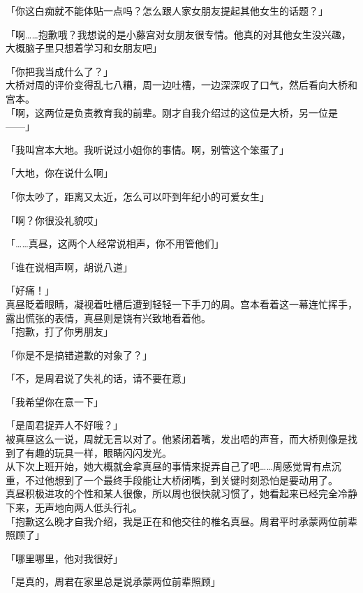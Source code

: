 「你这白痴就不能体贴一点吗？怎么跟人家女朋友提起其他女生的话题？」

「啊……抱歉哦？我想说的是小藤宫对女朋友很专情。他真的对其他女生没兴趣，大概脑子里只想着学习和女朋友吧」

「你把我当成什么了？」\\

大桥对周的评价变得乱七八糟，周一边吐槽，一边深深叹了口气，然后看向大桥和宫本。\\

「啊，这两位是负责教育我的前辈。刚才自我介绍过的这位是大桥，另一位是——」

「我叫宫本大地。我听说过小姐你的事情。啊，别管这个笨蛋了」

「大地，你在说什么啊」

「你太吵了，距离又太近，怎么可以吓到年纪小的可爱女生」

「啊？你很没礼貌哎」

「……真昼，这两个人经常说相声，你不用管他们」

「谁在说相声啊，胡说八道」

「好痛！」\\

真昼眨着眼睛，凝视着吐槽后遭到轻轻一下手刀的周。宫本看着这一幕连忙挥手，露出慌张的表情，真昼则是饶有兴致地看着他。\\

「抱歉，打了你男朋友」

「你是不是搞错道歉的对象了？」

「不，是周君说了失礼的话，请不要在意」

「我希望你在意一下」

「是周君捉弄人不好哦？」\\

被真昼这么一说，周就无言以对了。他紧闭着嘴，发出唔的声音，而大桥则像是找到了有趣的玩具一样，眼睛闪闪发光。\\

从下次上班开始，她大概就会拿真昼的事情来捉弄自己了吧……周感觉胃有点沉重，不过他想到了一个最终手段能让大桥闭嘴，到关键时刻恐怕是要动用了。\\

真昼积极进攻的个性和某人很像，所以周也很快就习惯了，她看起来已经完全冷静下来，无声地向两人低头行礼。\\

「抱歉这么晚才自我介绍，我是正在和他交往的椎名真昼。周君平时承蒙两位前辈照顾了」

「哪里哪里，他对我很好」

「是真的，周君在家里总是说承蒙两位前辈照顾」

